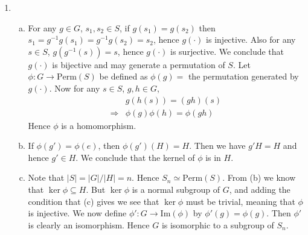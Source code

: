 \documentclass[A4paper,12pt]{article}
\theoremstyle{definition}
\numberwithin{equation}{section}
\begin{document}
\begin{enumerate}[1)]
\begin{enumerate}[(a)]
        \end{enumerate}
    \item
        \begin{enumerate}[(a)]
            \item
                For any $g \in G$, $s_1, s_2 \in S$, if $g(s_1) = g(s_2)$ then $s_1 = g^{-1}g(s_1) = g^{-1}g(s_2) = s_2$, hence $g(\cdot)$ is injective.
                Also for any $s \in S$, $g(g^{-1}(s)) = s$, hence $g(\cdot)$ is surjective. We conclude that $g(\cdot)$ is bijective and may generate a permutation of $S$.
                Let $\phi: G \rightarrow \mathrm{Perm}(S)$ be defined as $\phi(g) = $ the permutation generated by $g(\cdot)$.
                Now for any $s \in S$, $g, h \in G$, \begin{align*}
                    &g(h(s)) = (gh)(s) \\
                    \Rightarrow &\phi(g)\phi(h) = \phi(gh)
                \end{align*}
                Hence $\phi$ is a homomorphism.
            \item
                If $\phi(g') = \phi(e)$, then $\phi(g')(H) = H$. Then we have $g'H = H$ and hence $g' \in H$. We conclude that the kernel of $\phi$ is in $H$.
            \item
                Note that $|S| = |G| / |H| = n$. Hence $S_n \simeq \mathrm{Perm}(S)$.
                From (b) we know that $\ker \phi \subseteq H$. But $\ker \phi$ is a normal subgroup of $G$, and adding the condition that (c) gives we see that $\ker \phi$ must be trivial, meaning that $\phi$ is injective. We now define $\phi': G \rightarrow \mathrm{Im}(\phi)$ by $\phi'(g) = \phi(g)$. 
                Then $\phi'$ is clearly an isomorphism. Hence $G$ is isomorphic to a subgroup of $S_n$.
        \end{enumerate}


\end{enumerate}
\end{document}
